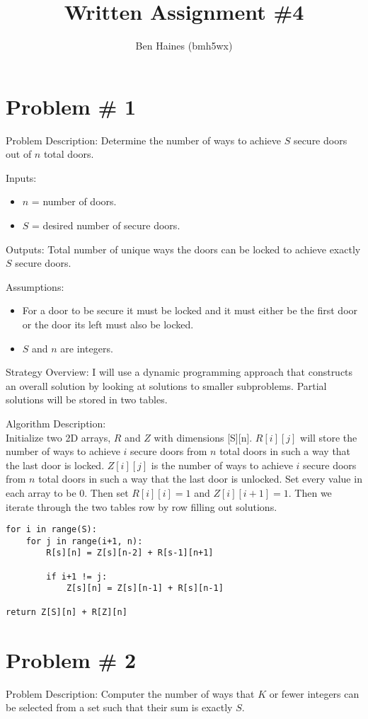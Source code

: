 \documentclass{article}
\begin{document}
\title{Written Assignment \#4}
\author{Ben Haines (bmh5wx)}

\section*{Problem \# 1}
Problem Description: Determine the number of ways to achieve $S$ secure doors out of $n$ total doors.

Inputs:
\begin{itemize}
    \item $n$ = number of doors.
    \item $S$ = desired number of secure doors.
\end{itemize}

Outputs: Total number of unique ways the doors can be locked to achieve exactly $S$ secure doors.

Assumptions:
\begin{itemize}
    \item For a door to be secure it must be locked and it must either be the first door or the door its left must also be locked.
    \item $S$ and $n$ are integers.
\end{itemize}

Strategy Overview:
I will use a dynamic programming approach that constructs an overall solution by looking at solutions to smaller subproblems. Partial solutions will be stored in two tables. 

Algorithm Description:\\
Initialize two 2D arrays, $R$ and $Z$ with dimensions [S][n]. $R[i][j]$ will store the number of ways to achieve $i$ secure doors from $n$ total doors in such a way that the last door is locked. $Z[i][j]$ is the number of ways to achieve $i$ secure doors from $n$ total doors in such a way that the last door is unlocked. Set every value in each array to be 0. Then set $R[i][i] = 1$ and $Z[i][i+1] = 1$. Then we iterate through the two tables row by row filling out solutions.
\begin{lstlisting}
for i in range(S):
    for j in range(i+1, n):
        R[s][n] = Z[s][n-2] + R[s-1][n+1]

        if i+1 != j:
            Z[s][n] = Z[s][n-1] + R[s][n-1]
            
return Z[S][n] + R[Z][n]
\end{lstlisting}

\section*{Problem \# 2}
Problem Description: Computer the number of ways that $K$ or fewer integers can be selected from a set such that their sum is exactly $S$.
\end{document}
